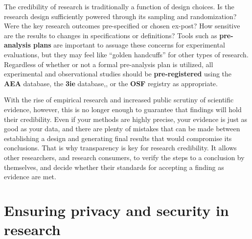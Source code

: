 The credibility of research is traditionally a function of design choices.\cite{angrist2010credibility,ioannidis2005most}
Is the research design sufficiently powered through its sampling and randomization?
Were the key research outcomes pre-specified or chosen ex-post?
How sensitive are the results to changes in specifications or definitions?
Tools such as \textbf{pre-analysis plans}
are important to assuage these concerns for experimental evaluations,
but they may feel like ``golden handcuffs'' for other types of research.\cite{olken2015promises}
Regardless of whether or not a formal pre-analysis plan is utilized,
all experimental and observational studies should be \textbf{pre-registered}
using the \textbf{AEA} database,
the \textbf{3ie} database,,
or the \textbf{OSF} registry as appropriate.

With the rise of empirical research and increased public scrutiny of scientific evidence, however,
this is no longer enough to guarantee that findings will hold their credibility.
Even if your methods are highly precise,
your evidence is just as good as your data,
and there are plenty of mistakes that can be made between establishing a design and generating final results that would compromise its conclusions.
That is why transparency is key for research credibility.
It allows other researchers, and research consumers,
to verify the steps to a conclusion by themselves,
and decide whether their standards for accepting a finding as evidence are met.



\section{Ensuring privacy and security in research}

